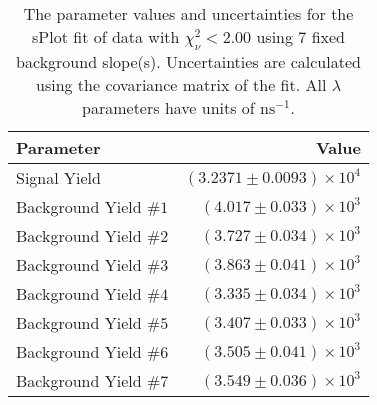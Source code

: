 
\begin{table}
    \begin{center}
        \begin{tabular}{lr}\toprule
            Parameter & Value \\\midrule
            Signal Yield & $(3.2371 \pm 0.0093) \times 10^{4}$ \\
            Background Yield $\#1$ & $(4.017 \pm 0.033) \times 10^{3}$ \\
            Background Yield $\#2$ & $(3.727 \pm 0.034) \times 10^{3}$ \\
            Background Yield $\#3$ & $(3.863 \pm 0.041) \times 10^{3}$ \\
            Background Yield $\#4$ & $(3.335 \pm 0.034) \times 10^{3}$ \\
            Background Yield $\#5$ & $(3.407 \pm 0.033) \times 10^{3}$ \\
            Background Yield $\#6$ & $(3.505 \pm 0.041) \times 10^{3}$ \\
            Background Yield $\#7$ & $(3.549 \pm 0.036) \times 10^{3}$ \\\bottomrule
        \end{tabular}
        \caption{The parameter values and uncertainties for the sPlot fit of data with $\chi^2_\nu < 2.00$ using 7 fixed background slope(s). Uncertainties are calculated using the covariance matrix of the fit. All $\lambda$ parameters have units of $\si{\nano\second}^{-1}$.}
    \end{center}
\end{table}
